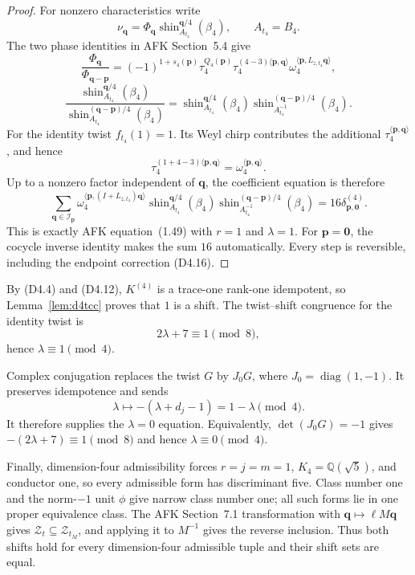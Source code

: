 \documentclass[11pt]{article}
\newcommand{\Q}{\mathbb Q}
\begin{document}
\begin{proof}
For nonzero characteristics write
\[
 \nu_{\boldsymbol q}
 =\Phi_{\boldsymbol q}
 \operatorname{shin}_{A_{t_4}}^{\boldsymbol q/4}(\beta_4),
 \qquad A_{t_4}=B_4.
\]
The two phase identities in AFK Section~5.4 give
\[
 \frac{\Phi_{\boldsymbol q}}{\Phi_{\boldsymbol q-\boldsymbol p}}
 =(-1)^{1+s_4(\boldsymbol p)}\tau_4^{Q_4(\boldsymbol p)}
  \tau_4^{(4-3)\langle\boldsymbol p,\boldsymbol q\rangle}
  \omega_4^{\langle\boldsymbol p,L_{z,t_4}\boldsymbol q\rangle},
\]
\[
 \frac{\operatorname{shin}_{A_{t_4}}^{\boldsymbol q/4}(\beta_4)}
 {\operatorname{shin}_{A_{t_4}}^{(\boldsymbol q-\boldsymbol p)/4}
  (\beta_4)}
 =
 \operatorname{shin}_{A_{t_4}}^{\boldsymbol q/4}(\beta_4)
 \operatorname{shin}_{A_{t_4}^{-1}}^{
   (\boldsymbol q-\boldsymbol p)/4}(\beta_4).
\]
For the identity twist $f_{t_4}(1)=1$.  Its Weyl chirp contributes
the additional
$\tau_4^{\langle\boldsymbol p,\boldsymbol q\rangle}$, and hence
\[
 \tau_4^{(1+4-3)\langle\boldsymbol p,\boldsymbol q\rangle}
 =\omega_4^{\langle\boldsymbol p,\boldsymbol q\rangle}.
\]
Up to a nonzero factor independent of $\boldsymbol q$, the coefficient
equation is therefore
\[
 \sum_{\boldsymbol q\in\mathcal I_{\boldsymbol p}}
 \omega_4^{\langle\boldsymbol p,
 (I+L_{z,t_4})\boldsymbol q\rangle}
 \operatorname{shin}_{A_{t_4}}^{\boldsymbol q/4}(\beta_4)
 \operatorname{shin}_{A_{t_4}^{-1}}^{
       (\boldsymbol q-\boldsymbol p)/4}(\beta_4)
 =16\delta_{\boldsymbol p,\boldsymbol0}^{(4)}.
\tag{D4.TCC}
\]
This is exactly AFK equation~(1.49) with $r=1$ and $\lambda=1$.
For $\boldsymbol p=\boldsymbol0$, the cocycle inverse identity makes
the sum $16$ automatically.  Every step is reversible, including the
endpoint correction \textup{(D4.16)}.
\end{proof}

By \textup{(D4.4)} and \textup{(D4.12)}, $K^{(4)}$ is a trace-one
rank-one idempotent, so Lemma~\ref{lem:d4tcc} proves that $1$ is a
shift.  The twist--shift congruence for the identity twist is
\[
 2\lambda+7\equiv1\pmod8,
\]
hence $\lambda\equiv1\pmod4$.

Complex conjugation replaces the twist $G$ by $J_0G$, where
$J_0=\operatorname{diag}(1,-1)$.  It preserves idempotence and sends
\[
 \lambda\longmapsto-(\lambda+d_j-1)=1-\lambda\pmod4.
\]
It therefore supplies the $\lambda=0$ equation.  Equivalently,
$\det(J_0G)=-1$ gives
$-(2\lambda+7)\equiv1\pmod8$ and hence
$\lambda\equiv0\pmod4$.

Finally, dimension-four admissibility forces
$r=j=m=1$, $K_4=\Q(\sqrt5)$, and conductor one, so every admissible
form has discriminant five.  Class number one and the norm-$-1$ unit
$\phi$ give narrow class number one; all such forms lie in one proper
equivalence class.  The AFK Section~7.1 transformation with
$\boldsymbol q\mapsto\ell M\boldsymbol q$ gives
$\mathcal Z_t\subseteq\mathcal Z_{t_M}$, and applying it to $M^{-1}$
gives the reverse inclusion.  Thus both shifts hold for every
dimension-four admissible tuple and their shift sets are equal.
\end{document}
